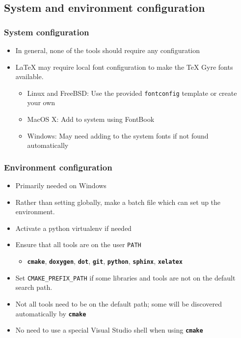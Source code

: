 \documentclass{beamer}
\newcommand{\cmd}[1]{\textbf{\texttt{#1}}}
\newcommand{\pkg}[1]{\texttt{#1}}
\begin{document}
\subsection{System and environment configuration}

\begin{frame}
  \frametitle{System configuration}
  \begin{itemize}
    \item In general, none of the tools should require any configuration
      \item \LaTeX{} may require local font configuration to make the \TeX{} Gyre fonts available.
        \begin{itemize}
          \item Linux and FreeBSD: Use the provided \pkg{fontconfig}
            template or create your own
          \item MacOS X: Add to system using FontBook
          \item Windows: May need adding to the system fonts if not
            found automatically
        \end{itemize}
  \end{itemize}
\end{frame}

\begin{frame}
  \frametitle{Environment configuration}
  \begin{itemize}
    \item Primarily needed on Windows
    \item Rather than setting globally, make a batch file which can set up the environment.
    \item Activate a python virtualenv if needed
    \item Ensure that all tools are on the user \texttt{PATH}
      \begin{itemize}
        \item \cmd{cmake}, \cmd{doxygen}, \cmd{dot}, \cmd{git}, \cmd{python}, \cmd{sphinx}, \cmd{xelatex}
      \end{itemize}
    \item Set \texttt{CMAKE\_PREFIX\_PATH} if some libraries and tools are not on the default search path.
    \item Not all tools need to be on the default path; some will be discovered automatically by \cmd{cmake}
    \item No need to use a special Visual Studio shell when using \cmd{cmake}
  \end{itemize}
\end{frame}
\end{document}
